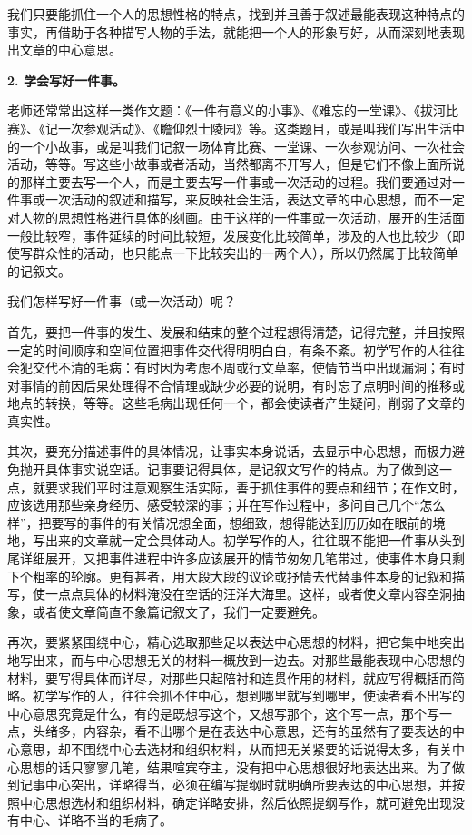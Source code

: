 我们只要能抓住一个人的思想性格的特点，找到并且善于叙述最能表现这种特点的事实，再借助于各种描写人物的手法，就能把一个人的形象写好，从而深刻地表现出文章的中心意思。

\textbf{2. 学会写好一件事。}

老师还常常出这样一类作文题：《一件有意义的小事》、《难忘的一堂课》、《拔河比赛》、《记一次参观活动》、《瞻仰烈士陵园》等。这类题目，或是叫我们写出生活中的一个小故事，或是叫我们记叙一场体育比赛、一堂课、一次参观访问、一次社会活动，等等。写这些小故事或者活动，当然都离不开写人，但是它们不像上面所说的那样主要去写一个人，而是主要去写一件事或一次活动的过程。我们要通过对一件事或一次活动的叙述和描写，来反映社会生活，表达文章的中心思想，而不一定对人物的思想性格进行具体的刻画。由于这样的一件事或一次活动，展开的生活面一般比较窄，事件延续的时间比较短，发展变化比较简单，涉及的人也比较少（即使写群众性的活动，也只能点一下比较突出的一两个人），所以仍然属于比较简单的记叙文。

我们怎样写好一件事（或一次活动）呢？

首先，要把一件事的发生、发展和结束的整个过程想得清楚，记得完整，并且按照一定的时间顺序和空间位置把事件交代得明明白白，有条不紊。初学写作的人往往会犯交代不清的毛病：有时因为考虑不周或行文草率，使情节当中出现漏洞；有时对事情的前因后果处理得不合情理或缺少必要的说明，有时忘了点明时间的推移或地点的转换，等等。这些毛病出现任何一个，都会使读者产生疑问，削弱了文章的真实性。

其次，要充分描述事件的具体情况，让事实本身说话，去显示中心思想，而极力避免抛开具体事实说空话。记事要记得具体，是记叙文写作的特点。为了做到这一点，就要求我们平时注意观察生活实际，善于抓住事件的要点和细节；在作文时，应该选用那些亲身经历、感受较深的事；并在写作过程中，多问自己几个“怎么样”，把要写的事件的有关情况想全面，想细致，想得能达到历历如在眼前的境地，写出来的文章就一定会具体动人。初学写作的人，往往既不能把一件事从头到尾详细展开，又把事件进程中许多应该展开的情节匆匆几笔带过，使事件本身只剩下个粗率的轮廓。更有甚者，用大段大段的议论或抒情去代替事件本身的记叙和描写，使一点点具体的材料淹没在空话的汪洋大海里。这样，或者使文章内容空洞抽象，或者使文章简直不象篇记叙文了，我们一定要避免。

再次，要紧紧围绕中心，精心选取那些足以表达中心思想的材料，把它集中地突出地写出来，而与中心思想无关的材料一概放到一边去。对那些最能表现中心思想的材料，要写得具体而详尽，对那些只起陪衬和连贯作用的材料，就应写得概括而简略。初学写作的人，往往会抓不住中心，想到哪里就写到哪里，使读者看不出写的中心意思究竟是什么，有的是既想写这个，又想写那个，这个写一点，那个写一点，头绪多，内容杂，看不出哪个是在表达中心意思，还有的虽然有了要表达的中心意思，却不围绕中心去选材和组织材料，从而把无关紧要的话说得太多，有关中心思想的话只寥寥几笔，结果喧宾夺主，没有把中心思想很好地表达出来。为了做到记事中心突出，详略得当，必须在编写提纲时就明确所要表达的中心思想，并按照中心思想选材和组织材料，确定详略安排，然后依照提纲写作，就可避免出现没有中心、详略不当的毛病了。

